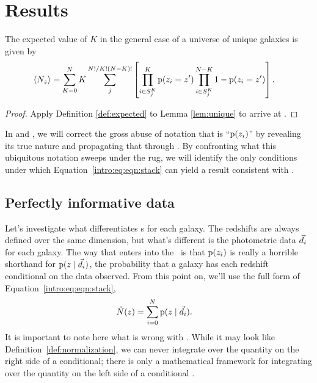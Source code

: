 \section{Results}

\begin{theorem}\label{thm:general}
	The expected value of $K$ in the general case of a universe of unique galaxies is given by
	\begin{align}
	\eqlabel{eqn:complete}
	\langle N_{z} \rangle &= \sum_{K = 0}^{N} K \sum_{j}^{N! / K! (N - K)!} \left[ \prod_{i \in S^{K}_{j}}^{K} \pr{z_{i} = z'} \prod_{i \in S^{K}_{j}}^{N - K} 1 - \pr{z_{i} = z'} \right].
	\end{align}
\end{theorem}
\begin{proof}
	Apply Definition \ref{def:expected} to Lemma \ref{lem:unique} to arrive at .
\end{proof}

In  and , we will correct the gross abuse of notation that is ``$\mathrm{p}(z_{i})$'' by revealing its true nature and propagating that through .
By confronting what this ubiquitous notation sweeps under the rug, we will identify the only conditions under which Equation~\ref{intro:eq:eqn:stack} can yield a result consistent with .

\subsection{Perfectly informative data}

Let's investigate what differentiates \pzpdf s for each galaxy.
The redshifts are always defined over the same dimension, but what's different is the photometric data $\vec{d}_{i}$ for each galaxy.
The way that enters into the \pzpdf\ is that $\mathrm{p}(z_{i})$ is really a horrible shorthand for $\mathrm{p}(z \mid \vec{d}_{i})$, the probability that a galaxy has each redshift conditional on the data observed.
From this point on, we'll use the full form of Equation~\ref{intro:eq:eqn:stack},
\begin{align}
\eqlabel{eqn:stackwithdata}
\hat{N}(z) &= \sum_{i = 0}^{N} \pr{z \gvn \data_{i}} .
\end{align}
It is important to note here what is wrong with .
While it may look like Definition~\ref{def:normalization}, we can never integrate over the quantity on the right side of a conditional; there is only a mathematical framework for integrating over the quantity on the left side of a conditional \citep{Hogg2012}.

